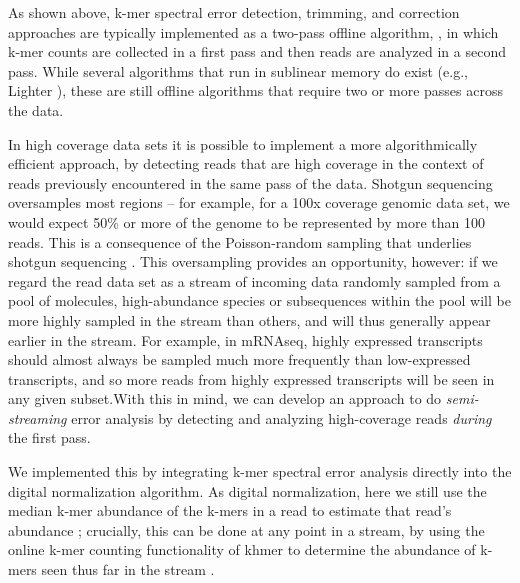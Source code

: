 As shown above, k-mer spectral error detection, trimming, and correction approaches
are typically implemented as a two-pass offline algorithm, , in which
k-mer counts are collected in a first pass and then reads are
analyzed in a second pass.  While several algorithms that run in
sublinear memory do exist (e.g., Lighter \cite{lighter}), these are
still offline algorithms that require two or more passes across
the data.



In high coverage data sets it is possible to implement a more
algorithmically efficient approach, by detecting reads that are high
coverage in the context of reads previously encountered in the same
pass of the data. 
Shotgun sequencing oversamples most regions -- for example, for a 100x
coverage genomic data set, we would expect 50\% or more of the genome
to be represented by more than 100 reads.  This is a consequence of
the Poisson-random sampling that underlies shotgun sequencing
\cite{waterman}.  This oversampling provides an opportunity, however:
if we regard the read data set as a stream of incoming data randomly
sampled from a pool of molecules, high-abundance species or
subsequences within the pool will be more highly sampled in the stream
than others, and will thus generally appear earlier in the stream.
For example, in mRNAseq, highly expressed transcripts should almost
always be sampled much more frequently than low-expressed transcripts,
and so more reads from highly expressed transcripts will be seen in
any given subset.With this in mind, we can develop an approach to do 
{\em semi-streaming} error analysis by detecting and
analyzing high-coverage reads {\em during} the first pass. 

We implemented this by integrating k-mer spectral
error analysis directly into the digital normalization algorithm.
As digital normalization, here we
still use the median k-mer abundance of the k-mers in a read to
estimate that read's abundance \cite{Brown2012}; crucially, this can
be done at any point in a stream, by using the online k-mer counting
functionality of khmer to determine the abundance of k-mers seen thus
far in the stream \cite{Zhang2014}. 


